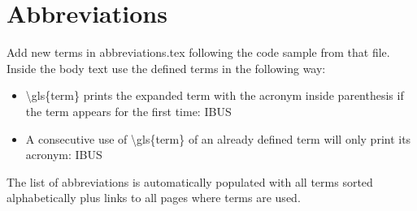 \chapter{Abbreviations}
Add new terms in abbreviations.tex following the code sample from that file. Inside the body text use the defined terms in the following way:
\begin{itemize}
	\item \textbackslash gls\{term\} prints the expanded term with the acronym inside parenthesis if the term appears for the first time:
	\gls{IBUS}
	
	\item A consecutive use of \textbackslash gls\{term\} of an already defined term will only print its acronym:
	\gls{IBUS}
\end{itemize}

The list of abbreviations is automatically populated with all terms sorted alphabetically plus links to all pages where terms are used.